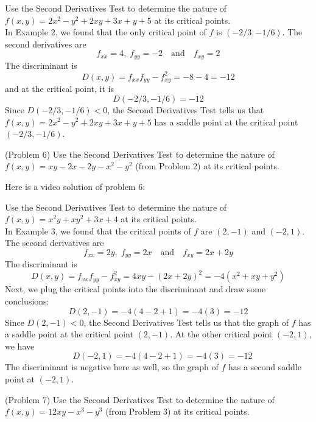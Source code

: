 \documentclass[handout]{ximera}
\begin{document}
\begin{example}[Example 6]
Use the Second Derivatives Test to determine the nature of $f(x,y) = 2x^2 - y^2 +2xy + 3x + y+ 5$ at its critical points.\\
In Example 2, we found that the only critical point of $f$ is $(-2/3,-1/6)$.
The second derivatives are
\[
f_{xx} = 4,\; f_{yy} = -2 \quad \text{and} \quad f_{xy} = 2
\]
The discriminant is
\[
D(x,y) = f_{xx} f_{yy} - f_{xy}^2 = -8 -4 = -12
\]
and at the critical point, it is
\[
D(-2/3,-1/6) = -12
\]
Since $D(-2/3,-1/6) < 0$, the Second Derivatives Test tells us that $f(x,y) = 2x^2 - y^2 +2xy + 3x + y+ 5$
has a saddle point at the critical point $(-2/3,-1/6)$.
\end{example}

\begin{problem}(Problem 6)
Use the Second Derivatives Test to determine the nature of $f(x,y) = xy - 2x-2y-x^2 - y^2$ (from Problem 2)
 at its critical points.\\
\end{problem}

Here is a video solution of problem 6:\\
\begin{foldable}
\end{foldable}


\begin{example}[Example 7]
Use the Second Derivatives Test to determine the nature of  $f(x,y) = x^2y +xy^2 +3x + 4$ at its critical points.\\
In Example 3, we found that the critical points of $f$ are $(2,-1)$ and $(-2, 1)$.
The second derivatives are
\[
f_{xx} = 2y,\; f_{yy} = 2x \quad \text{and} \quad f_{xy} = 2x + 2y
\]
The discriminant is
\[
D(x,y) = f_{xx} f_{yy} - f_{xy}^2 = 4xy - (2x+2y)^2 = -4(x^2 + xy +y^2)
\]
Next, we plug the critical points into the discriminant and draw some conclusions:
\[
D(2, -1) = -4(4 -2 +1) = -4(3) = -12 
\]
Since $D(2,-1)  < 0$, the Second Derivatives Test tells us 
that the graph of $f$ has a saddle point at the critical point $(2,-1)$.
At the other critical point $(-2, 1)$, we have
\[
\quad D(-2, 1) = -4(4 -2 +1) = -4(3) = -12
\]
The discriminant is negative here as well, 
so the graph of $f$ has a second saddle point at $(-2, 1)$.
\end{example}


\begin{problem}(Problem 7)
Use the Second Derivatives Test to determine the nature of  $f(x,y) = 12xy - x^3 - y^3$ 
(from Problem 3) at its critical points.\\
\end{problem}
\end{document}

